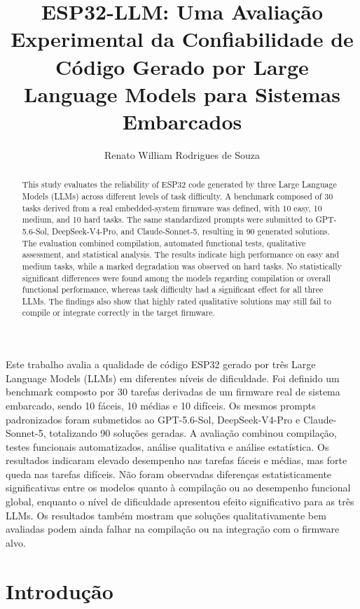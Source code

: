 \documentclass[12pt]{article}
\title{ESP32-LLM: Uma Avaliação Experimental da Confiabilidade de Código Gerado por Large Language Models para Sistemas Embarcados}
\author{Renato William Rodrigues de Souza}
\begin{document}
 

\maketitle

\begin{abstract}
This study evaluates the reliability of ESP32 code generated by three Large Language Models (LLMs) across different levels of task difficulty. A benchmark composed of 30 tasks derived from a real embedded-system firmware was defined, with 10 easy, 10 medium, and 10 hard tasks. The same standardized prompts were submitted to GPT-5.6-Sol, DeepSeek-V4-Pro, and Claude-Sonnet-5, resulting in 90 generated solutions. The evaluation combined compilation, automated functional tests, qualitative assessment, and statistical analysis. The results indicate high performance on easy and medium tasks, while a marked degradation was observed on hard tasks. No statistically significant differences were found among the models regarding compilation or overall functional performance, whereas task difficulty had a significant effect for all three LLMs. The findings also show that highly rated qualitative solutions may still fail to compile or integrate correctly in the target firmware.
\end{abstract}
     
\begin{resumo}
Este trabalho avalia a qualidade de código ESP32 gerado por três Large Language Models (LLMs) em diferentes níveis de dificuldade. Foi definido um benchmark composto por 30 tarefas derivadas de um firmware real de sistema embarcado, sendo 10 fáceis, 10 médias e 10 difíceis. Os mesmos prompts padronizados foram submetidos ao GPT-5.6-Sol, DeepSeek-V4-Pro e Claude-Sonnet-5, totalizando 90 soluções geradas. A avaliação combinou compilação, testes funcionais automatizados, análise qualitativa e análise estatística. Os resultados indicaram elevado desempenho nas tarefas fáceis e médias, mas forte queda nas tarefas difíceis. Não foram observadas diferenças estatisticamente significativas entre os modelos quanto à compilação ou ao desempenho funcional global, enquanto o nível de dificuldade apresentou efeito significativo para as três LLMs. Os resultados também mostram que soluções qualitativamente bem avaliadas podem ainda falhar na compilação ou na integração com o firmware alvo.
\end{resumo}

\section{Introdução}
\label{sec:introducao}
\end{document}
